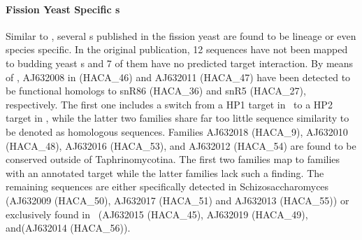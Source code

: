 \paragraph{\textbf{Fission Yeast Specific \sno s}}

%
%
%
Similar to \calb, several \sno s published in the fission
yeast \cite{Li:2005} are found to be lineage or even species
specific. In the original publication, 12 sequences have not been mapped to budding yeast \sno s and 7 of them have no predicted target interaction. By means of \snostrip, AJ632008 in \cite{Li:2005} (HACA\_46) and AJ632011 (HACA\_47) have been detected to be functional homologs to snR86 (HACA\_36) and snR5 (HACA\_27), respectively. The first one includes a switch from a HP1 target in \spo\ to a HP2 target in \sce, while the latter two families share far too little sequence similarity to be denoted as homologous sequences. Families AJ632018 (HACA\_9), AJ632010 (HACA\_48), AJ632016 (HACA\_53), and AJ632012 (HACA\_54) are found to be conserved outside of Taphrinomycotina. The first two families map to families with an annotated target while the latter families lack such a finding. The remaining sequences are either specifically detected in Schizosaccharomyces (AJ632009 (HACA\_50), AJ632017 (HACA\_51) and AJ632013 (HACA\_55)) or exclusively found in \spo\ (AJ632015 (HACA\_45), AJ632019 (HACA\_49), and(AJ632014 (HACA\_56)).


